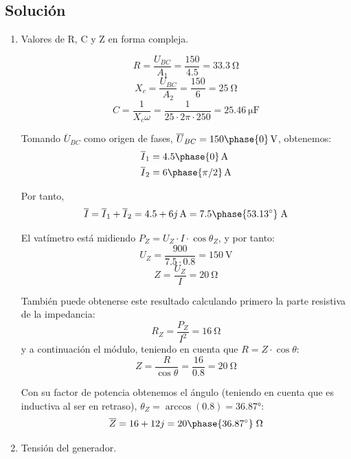 \subsection*{Solución}
\begin{enumerate}
\item Valores de R, C y Z en forma compleja.
  
\begin{equation*}
    R = \frac{U_{BC}}{A_1} = \frac{150}{4.5} = \qty{33.3}{\ohm}
  \end{equation*}
  \begin{equation*}
    X_c = \frac{U_{BC}}{A_2} = \frac{150}{6} = \qty{25}{\ohm}
  \end{equation*}
  \begin{equation*}
    C = \frac{1}{X_c\omega} = \frac{1}{25 \cdot 2 \pi \cdot 250} = \qty{25.46}{\micro\farad}
  \end{equation*}

  Tomando $\overline{U}_{BC}$ como origen de fases, $\overline{U}_{BC} = \qty[parse-numbers=false]{150\phase{0}}{\volt}$, obtenemos:
  \begin{align*}
    \overline{I}_1 &= \qty[parse-numbers=false]{4.5\phase{0}}{\ampere}\\
    \overline{I}_2 &= \qty[parse-numbers=false]{6\phase{\pi/2}}{\ampere}
  \end{align*}

  Por tanto,
  \[
    \overline{I} = \overline{I}_1 + \overline{I}_2 = \qty[parse-numbers=false]{4.5+6j}{\ampere} = 7.5\phase{\ang{53.13}}\;\si{\ampere}
  \]
  
  El vatímetro está midiendo $P_Z = U_Z \cdot I \cdot \cos \theta_Z$, y por tanto:
  \[
    U_Z = \frac{900}{7.5 \cdot 0.8} = \qty{150}{\volt}
  \]
  \[
    Z = \frac{U_Z}{I} = \qty{20}{\ohm}
  \]

    También puede obtenerse este resultado calculando primero la parte resistiva de la impedancia:
  \[
    R_Z = \frac{P_Z}{I^2} = \qty{16}{\ohm}
  \]
  y a continuación el módulo, teniendo en cuenta que $R = Z \cdot \cos \theta$:
  \[
    Z = \frac{R}{\cos \theta} = \frac{16}{0.8} = \qty{20}{\ohm}
  \]

  Con su factor de potencia obtenemos el ángulo (teniendo en cuenta que es inductiva al ser en retraso), $\theta_Z = \arccos(0.8) = \ang{36.87}$:
  \[
    \overline{Z} = 16 + 12j  = 20\phase{\ang{36.87}}\;\si{\ohm}
  \]

  
\item Tensión del generador.


\end{enumerate}
